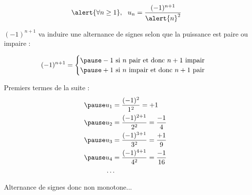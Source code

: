 \documentclass[9pt,handout,hyperref]{beamer}
\begin{document}
\begin{frame}

	$$\alert{\forall n\ge 1}, ~~u_n = \frac{(-1)^{n+1}}{\alert{n}^2}$$

\pause $(-1)^{n+1}$ va induire une alternance de signes selon que la puissance est paire ou impaire :

\[
(-1)^{n+1} =
\begin{cases}
\pause -1 \text{ si $n$ pair et donc $n+1$ impair} \\
\pause +1 \text{ si $n$ impair et donc $n+1$ pair}\\
\end{cases}
\]

\pause 	Premiers termes de la suite :
\[\begin{aligned}
\pause 	&u_1 = \frac{(-1)^{2}}{1^2} = +1 \\
\pause 	&u_2 = \frac{(-1)^{2+1}}{2^2} = \frac{-1}{4} \\
\pause 	&u_3 = \frac{(-1)^{3+1}}{3^2} = \frac{+1}{9} \\
\pause 	&u_4 = \frac{(-1)^{4+1}}{4^2} = \frac{-1}{16} \\
&\dots
\end{aligned}\]

\pause Alternance de signes donc non monotone...

\end{frame}
\end{document}
